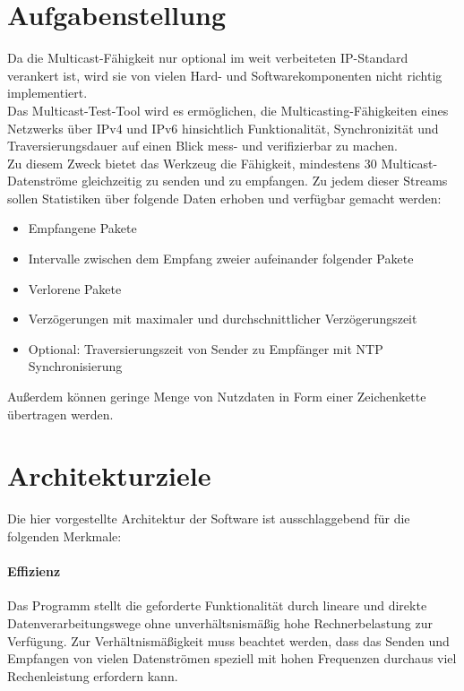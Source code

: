 
\section{Aufgabenstellung}
\label{sec:1:aufg}


Da die Multicast-Fähigkeit nur optional im weit verbeiteten IP-Standard
verankert ist, wird sie von vielen Hard- und Softwarekomponenten nicht richtig
implementiert.\\
Das Multicast-Test-Tool wird es ermöglichen, die Multicasting-Fähigkeiten eines
Netzwerks über IPv4 und IPv6 hinsichtlich Funktionalität, Synchronizität und
Traversierungsdauer auf einen Blick mess- und verifizierbar zu machen.\\
Zu diesem Zweck bietet das Werkzeug die Fähigkeit, mindestens 30
Multicast-Datenströme gleichzeitig zu senden und zu empfangen. Zu jedem dieser
Streams sollen Statistiken über folgende Daten erhoben und verfügbar gemacht
werden:
\begin{itemize}
  \item Empfangene Pakete
  \item Intervalle zwischen dem Empfang zweier aufeinander
folgender Pakete
\item Verlorene Pakete
\item Verzögerungen mit maximaler und
durchschnittlicher Verzögerungszeit
\item Optional: Traversierungszeit von Sender zu Empfänger mit NTP
Synchronisierung
\end{itemize}
Außerdem können geringe Menge von Nutzdaten in Form einer Zeichenkette
übertragen werden.\\

\section{Architekturziele}
\label{sec:1:arch}

Die hier vorgestellte Architektur der Software ist ausschlaggebend für die
folgenden Merkmale:

\paragraph{Effizienz} Das Programm stellt die geforderte Funktionalität durch
lineare und direkte Datenverarbeitungswege ohne unverhältsnismäßig hohe
Rechnerbelastung zur Verfügung. Zur Verhältnismäßigkeit muss beachtet werden,
dass das Senden und Empfangen von vielen Datenströmen speziell mit hohen
Frequenzen durchaus viel Rechenleistung erfordern kann.

